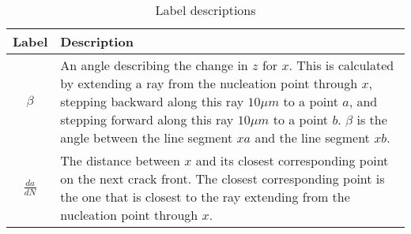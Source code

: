 \begin{table}[b]
  \centering
  \caption{Label descriptions}
  \label{table:label-descriptions}
  \begin{tabular}{| c | p{13cm} |}
  \hline
  \textbf{Label} & \textbf{Description} \\
  \hline
  $\beta$ & An angle describing the change in $z$ for $x$. This is calculated by extending a ray from the nucleation point through $x$, stepping backward along this ray $10 \mu m$ to a point $a$, and stepping forward along this ray $10 \mu m$ to a point $b$. $\beta$ is the angle between the line segment $xa$ and the line segment $xb$. \\ \hline
  $\frac{da}{dN}$ & The distance between $x$ and its closest corresponding point on the next crack front.  The closest corresponding point is the one that is closest to the ray extending from the nucleation point through $x$. \\ \hline
  \end{tabular}
\end{table}

